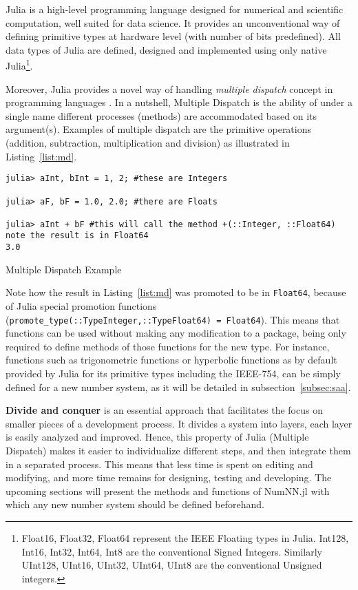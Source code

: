 Julia \cite{Julia,Bezanson2017} is a high-level programming language designed for numerical and scientific computation, well suited for data science. It provides an unconventional way of defining primitive types at hardware level (with number of bits predefined). All data types of Julia are defined, designed and implemented using only native Julia\footnote{{Float16, Float32, Float64} represent the IEEE Floating types in Julia. {Int128, Int16, Int32, Int64, Int8} are the conventional Signed Integers. Similarly {UInt128, UInt16, UInt32, UInt64, UInt8} are the conventional Unsigned integers.}.

Moreover, Julia provides a novel way of handling \emph{multiple dispatch} \cite{WikiMultipleDispatch} concept in programming languages \cite{JuliaMehtods}. In a nutshell, Multiple Dispatch is the ability of under a single name different processes (methods) are accommodated based on its argument(s). Examples of multiple dispatch are the primitive operations (addition, subtraction, multiplication and division) as illustrated in Listing~\ref{list:md}.

\begin{listing}[H]
\begin{verbatim}
julia> aInt, bInt = 1, 2; #these are Integers

julia> aF, bF = 1.0, 2.0; #there are Floats

julia> aInt + bF #this will call the method +(::Integer, ::Float64) note the result is in Float64
3.0
\end{verbatim}
\caption{Multiple Dispatch Example}\label{list:md}
\end{listing}

Note how the result in Listing~\ref{list:md} was promoted to be in \texttt{Float64}, because of Julia special promotion functions (\texttt{promote_type(::Type{Integer},::Type{Float64}) = Float64}). This means that functions can be used without making any modification to a package, being only required to define methods of those functions for the new type. For instance, functions such as trigonometric functions or hyperbolic functions as by default provided by Julia for its primitive types including the IEEE-754, can be simply defined for a new number system, as it will be detailed in subsection~\ref{subsec:saa}.

\textbf{Divide and conquer} is an essential approach that facilitates the focus on smaller pieces of a development process. It divides a system into layers, each layer is easily analyzed and improved. Hence, this property of Julia (Multiple Dispatch) makes it easier to individualize different steps, and then integrate them in a separated process. This means that less time is spent on editing and modifying, and more time remains for designing, testing and developing. The upcoming sections will present the methods and functions of NumNN.jl with which any new number system should be defined beforehand.

